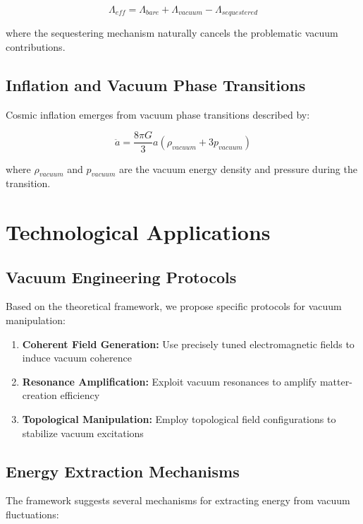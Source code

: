 \documentclass[12pt,a4paper]{article}
\begin{document}
\begin{equation}
\Lambda_{eff} = \Lambda_{bare} + \Lambda_{vacuum} - \Lambda_{sequestered}
\end{equation}

where the sequestering mechanism naturally cancels the problematic vacuum contributions.

\subsection{Inflation and Vacuum Phase Transitions}

Cosmic inflation emerges from vacuum phase transitions described by:

\begin{equation}
\ddot{a} = \frac{8\pi G}{3} a \left(\rho_{vacuum} + 3p_{vacuum}\right)
\end{equation}

where $\rho_{vacuum}$ and $p_{vacuum}$ are the vacuum energy density and pressure during the transition.

\section{Technological Applications}

\subsection{Vacuum Engineering Protocols}

Based on the theoretical framework, we propose specific protocols for vacuum manipulation:

\begin{enumerate}
    \item \textbf{Coherent Field Generation:} Use precisely tuned electromagnetic fields to induce vacuum coherence
    \item \textbf{Resonance Amplification:} Exploit vacuum resonances to amplify matter-creation efficiency
    \item \textbf{Topological Manipulation:} Employ topological field configurations to stabilize vacuum excitations
\end{enumerate}

\subsection{Energy Extraction Mechanisms}

The framework suggests several mechanisms for extracting energy from vacuum fluctuations:
\end{document}

